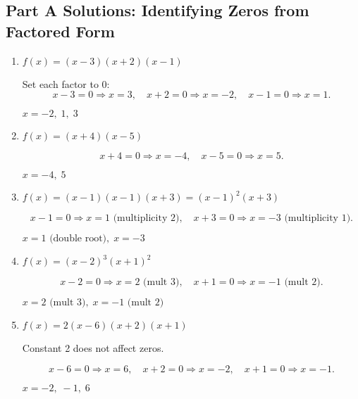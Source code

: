 \documentclass[12pt]{article}
\begin{document}
\subsection*{Part A Solutions: Identifying Zeros from Factored Form}
\begin{enumerate}
  \item \(f(x) = (x - 3)(x + 2)(x - 1)\)

  Set each factor to 0:
  \[
  x - 3 = 0 \Rightarrow x = 3,\quad
  x + 2 = 0 \Rightarrow x = -2,\quad
  x - 1 = 0 \Rightarrow x = 1.
  \]

  \(\boxed{x = -2,\; 1,\; 3}\)

  \item \(f(x) = (x + 4)(x - 5)\)

  \[
  x + 4 = 0 \Rightarrow x = -4,\quad
  x - 5 = 0 \Rightarrow x = 5.
  \]

  \(\boxed{x = -4,\; 5}\)

  \item \(f(x) = (x - 1)(x - 1)(x + 3) = (x - 1)^2(x + 3)\)

  \[
  x - 1 = 0 \Rightarrow x = 1 \text{ (multiplicity 2)}, \quad
  x + 3 = 0 \Rightarrow x = -3 \text{ (multiplicity 1)}.
  \]

  \(\boxed{x = 1 \text{ (double root)},\; x = -3}\)

  \item \(f(x) = (x - 2)^3(x + 1)^2\)

  \[
  x - 2 = 0 \Rightarrow x = 2 \text{ (mult 3)},\quad
  x + 1 = 0 \Rightarrow x = -1 \text{ (mult 2)}.
  \]

  \(\boxed{x = 2 \text{ (mult 3)},\; x = -1 \text{ (mult 2)}}\)

  \item \(f(x) = 2(x - 6)(x + 2)(x + 1)\)

  Constant 2 does not affect zeros.

  \[
  x - 6 = 0 \Rightarrow x = 6,\quad
  x + 2 = 0 \Rightarrow x = -2,\quad
  x + 1 = 0 \Rightarrow x = -1.
  \]

  \(\boxed{x = -2,\; -1,\; 6}\)
\end{enumerate}
\end{document}
